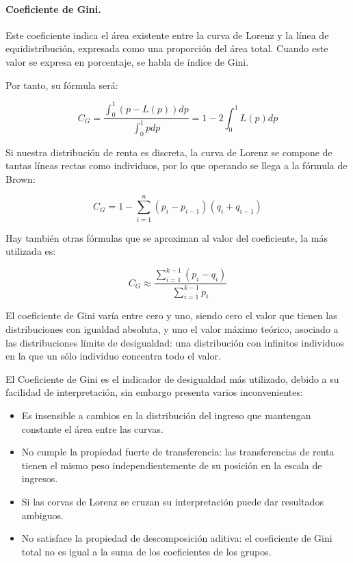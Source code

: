 \paragraph{Coeficiente de Gini.}

Este coeficiente indica el \'area existente entre la curva de Lorenz y la l\'inea de equidistribuci\'on, expresada como una proporci\'on del \'area total. Cuando este valor se expresa en porcentaje, se habla de \'indice de Gini.

Por tanto, su f\'ormula ser\'a:

\[C_G=\dfrac{\int_0^1(p-L(p))dp}{\int_0^1p dp}=1-2\int_0^1L(p)dp\]

Si nuestra distribuci\'on de renta es discreta, la curva de Lorenz se compone de tantas l\'ineas rectas como individuos, por lo que operando se llega a la f\'ormula de Brown:

\[C_G=1-\sum_{i=1}^n(p_i-p_{i-1})(q_i+q_{i-1})\]

Hay tambi\'en otras f\'ormulas que se aproximan al valor del coeficiente, la m\'as utilizada es:

\[C_G\approx \dfrac{\sum_{i=1}^{k-1}(p_i-q_i)}{\sum_{i=1}^{k-1}p_i}\]

El coeficiente de Gini var\'ia entre cero y uno, siendo cero el valor que tienen las distribuciones con igualdad absoluta, y uno el valor m\'aximo te\'orico, asociado a las distribuciones l\'imite de desigualdad: una distribuci\'on con infinitos individuos en la que un s\'olo individuo concentra todo el valor.

El Coeficiente de Gini es el indicador de desigualdad m\'as utilizado, debido a su facilidad de interpretaci\'on, sin embargo presenta varios inconvenientes:

\begin{itemize}
\item Es insensible a cambios en la distribuci\'on del ingreso que mantengan constante el \'area entre las curvas.
\item No cumple la propiedad fuerte de transferencia: las transferencias de renta tienen el mismo peso independientemente de su posici\'on en la escala de ingresos.
\item Si las corvas de Lorenz se cruzan su interpretaci\'on puede dar resultados ambiguos.
\item No satisface la propiedad de descomposici\'on aditiva: el coeficiente de Gini total no es igual a la suma de los coeficientes de los grupos.
\end{itemize}

